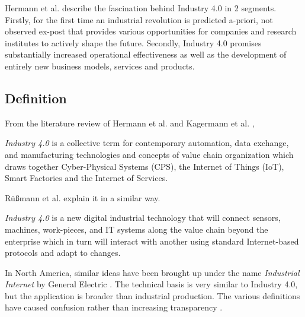 Hermann et al. \cite{IN4DESIGN} describe the fascination behind Industry 4.0 in 2 segments. Firstly, for the first time an industrial revolution is predicted a-priori, not observed ex-post that provides various opportunities for companies and research institutes to actively shape the future. Secondly, Industry 4.0 promises substantially increased operational effectiveness as well as the development of entirely new business models, services and products.
\subsection{Definition}
From the literature review of Hermann et al. \cite{IN4DESIGN} and Kagermann et al. \cite{VDINACH},
\begin{definition}
	\textit{Industry 4.0} is a collective term for contemporary automation, data exchange, and manufacturing technologies and concepts of value chain organization which draws together Cyber-Physical Systems (CPS), the Internet of Things (IoT), Smart Factories and the Internet of Services. 
\end{definition}
Rüßmann et al. \cite{IN4BCG} explain it in a similar way.
\begin{definition}
	\textit{Industry 4.0} is a new digital industrial technology that will connect sensors, machines, work-pieces, and IT systems along the value chain beyond the enterprise which in turn will interact with another using standard Internet-based protocols and adapt to changes.
\end{definition}
In North America, similar ideas have been brought up under the name \textit{Industrial Internet} by General Electric \cite{INDUSINTERNET}. The technical basis is very similar to Industry 4.0, but the application is broader than industrial production. The various definitions have caused confusion rather than increasing transparency \cite{IN4HYPE}.
